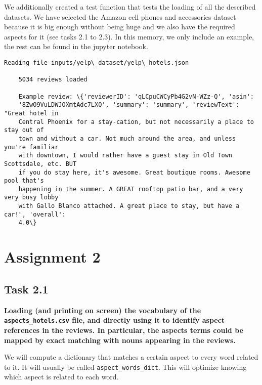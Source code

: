 \documentclass[11pt]{article}
\begin{document}
We additionally created a test function that tests the loading of all the
described datasets. We have selected the Amazon cell phones and
accessories dataset because it is big enough without being huge and we
also have the required aspects for it (see tasks 2.1 to 2.3). In this memory, we only include an example, the rest can be found in the jupyter notebook.


\begin{Verbatim}[commandchars=\\\{\}]
    Reading file inputs/yelp\_dataset/yelp\_hotels.json

    5034 reviews loaded

    Example review: \{'reviewerID': 'qLCpuCWCyPb4G2vN-WZz-Q', 'asin':
    '8ZwO9VuLDWJOXmtAdc7LXQ', 'summary': 'summary', 'reviewText': "Great hotel in
    Central Phoenix for a stay-cation, but not necessarily a place to stay out of
    town and without a car. Not much around the area, and unless you're familiar
    with downtown, I would rather have a guest stay in Old Town Scottsdale, etc. BUT
    if you do stay here, it's awesome. Great boutique rooms. Awesome pool that's
    happening in the summer. A GREAT rooftop patio bar, and a very very busy lobby
    with Gallo Blanco attached. A great place to stay, but have a car!", 'overall':
    4.0\}

\end{Verbatim}

\hypertarget{assignment-2}{%
    \section{Assignment 2}\label{assignment-2}}

\hypertarget{task-2.1}{%
    \subsection{Task 2.1}\label{task-2.1}}

\textbf{Loading (and printing on screen) the vocabulary of the
    \texttt{aspects\_hotels.csv} file, and directly using it to identify
    aspect references in the reviews. In particular, the aspects terms could
    be mapped by exact matching with nouns appearing in the reviews.}

We will compute a dictionary that matches a certain aspect to every word
related to it. It will usually be called \texttt{aspect\_words\_dict}.
This will optimize knowing which aspect is related to each word.
\end{document}

